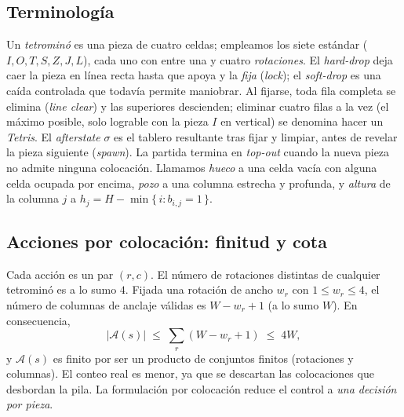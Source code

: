 \subsection{Terminología}
Un \emph{tetrominó} es una pieza de cuatro celdas; empleamos los siete estándar
($I, O, T, S, Z, J, L$), cada uno con entre una y cuatro \emph{rotaciones}. El
\emph{hard-drop} deja caer la pieza en línea recta hasta que apoya y la
\emph{fija} (\emph{lock}); el \emph{soft-drop} es una caída controlada que todavía
permite maniobrar. Al fijarse, toda fila completa se elimina (\emph{line clear})
y las superiores descienden; eliminar cuatro filas a la vez (el máximo posible,
solo lograble con la pieza $I$ en vertical) se denomina hacer un \emph{Tetris}.
El \emph{afterstate} $\sigma$ es el tablero resultante tras fijar y limpiar, antes
de revelar la pieza siguiente (\emph{spawn}). La partida termina en \emph{top-out}
cuando la nueva pieza no admite ninguna colocación. Llamamos \emph{hueco} a una
celda vacía con alguna celda ocupada por encima, \emph{pozo} a una columna estrecha
y profunda, y \emph{altura} de la columna $j$ a
$h_j = H - \min\{\, i : b_{i,j} = 1 \,\}$.

\subsection{Acciones por colocación: finitud y cota}
\label{subsec:acciones}
Cada acción es un par $(r, c)$. El número de rotaciones distintas de cualquier
tetrominó es a lo sumo $4$. Fijada una rotación de ancho $w_r$ con
$1 \le w_r \le 4$, el número de columnas de anclaje válidas es $W - w_r + 1$ (a lo sumo $W$). En
consecuencia,
\[
    |\mathcal{A}(s)| \;\le\; \sum_{r} (W - w_r + 1) \;\le\; 4W,
\]
y $\mathcal{A}(s)$ es finito por ser un producto de conjuntos finitos (rotaciones
y columnas). El conteo real es menor, ya que se descartan las colocaciones que
desbordan la pila. La formulación por colocación reduce el control a \emph{una
    decisión por pieza}.

